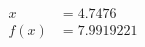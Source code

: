 \documentclass[preview]{standalone}
\begin{document}
\begin{align*}
x &= 4.7476\\f(x) &= 7.9919221
\end{align*}
\end{document}
